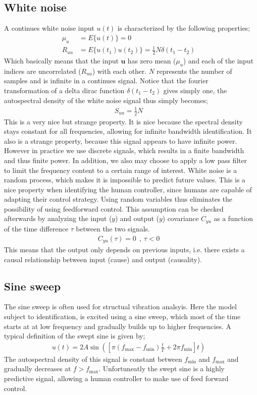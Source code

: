 \subsection{White noise}
A continues white noise input ${u(t)}$ is characterized by the following properties;
	\begin{align}
			\mu_u &= E\{{u}(t)\} = 0  \\
			R_{uu} &= E\{{u}(t_1){u}(t_2)\} = \tfrac{1}{2}N\delta(t_1-t_2)
	\end{align}
Which basically means that the input $\mathbf{u}$ has zero mean ($\mu_u$) and each of the input indices are uncorrelated ($R_{uu}$) with each other. $N$ represents the number of samples and is infinite in a continues signal. Notice that the fourier transformation of a delta dirac function $\delta(t_1-t_2)$ gives simply one, the autospectral density of the white noise signal thus simply becomes;
	\begin{align}
			S_{uu} = \tfrac{1}{2}N
	\end{align}
This is a very nice but strange property. It is nice because the spectral density stays constant for all frequencies, allowing for infinite bandwidth identification. It also is a strange property, because this signal appears to have infinite power. However in practice we use discrete signals, which results in a finite bandwidth and thus finite power. In addition, we also may choose to apply a low pass filter to limit the frequency content to a certain range of interest.
		White noise is a random process, which makes it is impossible to predict future values. This is a nice property when identifying the human controller, since humans are capable of adapting their control strategy. Using random variables thus eliminates the possibility of using feedforward control. This assumption can be checked afterwards by analyzing the input ($y$) and output ($y$) covariance $C_{yu}$ as a function of the time difference $\tau$ between the two signals. 
	\begin{align}
			C_{yu} (\tau) = 0 \ \ , \ \tau < 0  
	\end{align}
This means that the output only depends on previous inputs, i.e. there exists a causal relationship between input (cause) and output (causality).
\subsection{Sine sweep}
The sine sweep is often used for structual vibration analsyis. Here the model subject to identification, is excited using a sine sweep, which most of the time starts at at low frequency and gradually builds up to higher frequencies. A typical definition of the swept sine is given by;
	\begin{align}
			u(t) = 2A\sin\left(\left[\pi(f_\textrm{max}-f_\textrm{min})\frac{t}{T} + 2\pi f_\textrm{min}\right] t\right)
	\end{align}
The autospectral density of this signal is constant between $f_\textrm{min}$ and $f_\textrm{max}$ and gradually decreases at $f>f_\textrm{max}$.
		Unfortuneatly the swept sine is a highly predictive signal, allowing a human controller to make use of feed forward control.
